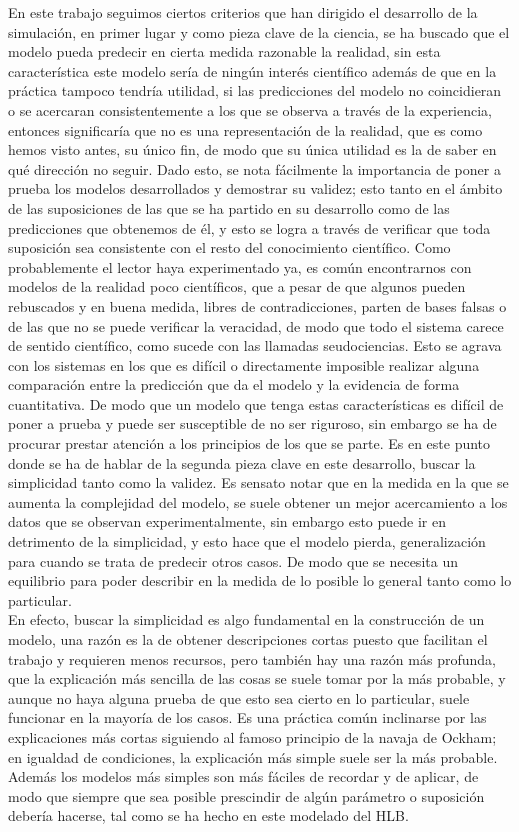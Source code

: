 En este trabajo seguimos ciertos criterios que han dirigido el desarrollo de la simulación, en primer lugar y como pieza clave de la ciencia, se ha buscado que el modelo pueda predecir en cierta medida razonable la realidad, sin esta característica este modelo sería de ningún interés científico además de que en la práctica tampoco tendría utilidad, si las predicciones del modelo no coincidieran o se acercaran consistentemente a los que se observa a través de la experiencia, entonces significaría que no es una representación de la realidad, que es como hemos visto antes, su único fin, de modo que su única utilidad es la de saber en qué dirección no seguir. Dado esto, se nota fácilmente la importancia de poner a prueba los modelos desarrollados y demostrar su validez; esto tanto en el ámbito de las suposiciones de las que se ha partido en su desarrollo como de las predicciones que obtenemos de él, y esto se logra a través de verificar que toda suposición sea consistente con el resto del conocimiento científico. Como probablemente el lector haya experimentado ya, es común encontrarnos con modelos de la realidad poco científicos, que a pesar de que algunos pueden rebuscados y en buena medida, libres de contradicciones, parten de bases falsas o de las que no se puede verificar la veracidad, de modo que todo el sistema carece de sentido científico, como sucede con las llamadas seudociencias.  Esto se agrava con los sistemas en los que es difícil o directamente imposible realizar alguna comparación entre la predicción que da el modelo y la evidencia de forma cuantitativa. De modo que un modelo que tenga estas características es difícil de poner a prueba y puede ser susceptible de no ser riguroso, sin embargo se ha de procurar prestar atención a los principios de los que se parte. Es en este punto donde se ha de hablar de la segunda pieza clave en este desarrollo,  buscar la simplicidad tanto como la validez. Es sensato notar que en la medida en la que se aumenta la complejidad del modelo, se suele obtener un mejor acercamiento a los datos que se observan experimentalmente, sin embargo esto puede ir en detrimento de la simplicidad, y esto hace que el modelo pierda, generalización para cuando se trata de predecir otros casos. De modo que se necesita un equilibrio para poder describir en la medida de lo posible lo general tanto como lo particular.\\
En efecto, buscar la simplicidad es algo fundamental en la construcción de un modelo, una razón es la de obtener descripciones cortas puesto que facilitan el trabajo y requieren menos recursos, pero también hay una razón más profunda, que la explicación más sencilla de las cosas se suele tomar por la más probable, y aunque no haya alguna prueba de que esto sea cierto en lo particular, suele funcionar en la mayoría de los casos. Es una práctica común inclinarse por las explicaciones más cortas siguiendo al famoso principio de la navaja de Ockham; en igualdad de condiciones, la explicación más simple suele ser la más probable. Además los modelos más simples son más fáciles de recordar y de aplicar, de modo que siempre que sea posible prescindir de algún parámetro o suposición debería hacerse, tal como se ha hecho en este modelado del HLB.

